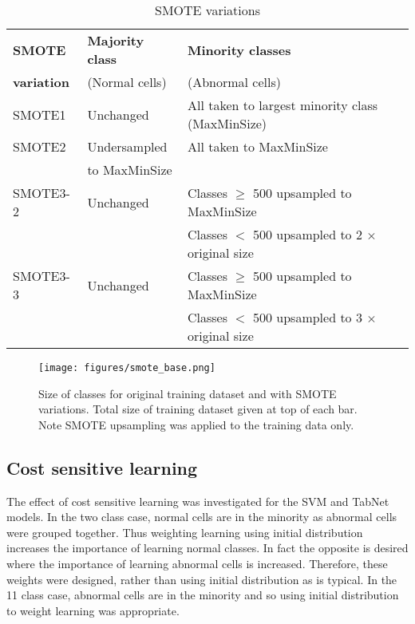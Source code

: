 \documentclass[final,5p,times,twocolumn,authoryear]{elsarticle}
\begin{document}
\begin{table}[t!]
\caption{SMOTE variations}
\scriptsize
\centering
\begin{tabular}{@{}lll@{}} 
\toprule
    \centering
    \textbf{SMOTE}  & \textbf{Majority class} & \textbf{Minority classes} \\ 
     \textbf{variation}& (Normal cells) & (Abnormal cells) \\ \midrule
    SMOTE1 & Unchanged & All taken to largest minority class (MaxMinSize) \\
    SMOTE2 & Undersampled & All taken to MaxMinSize \\
    & to MaxMinSize  & \\
    SMOTE3-2 & Unchanged & Classes $\geqslant$ 500 upsampled to MaxMinSize \\
      &  & Classes $<$ 500 upsampled to 2 $\times$ original size \\     
    SMOTE3-3 & Unchanged & Classes $\geqslant$ 500 upsampled to MaxMinSize \\
      &  & Classes $<$ 500 upsampled to 3 $\times$ original size \\
 \bottomrule
\end{tabular}

\label{table:5}
\end{table}

\begin{figure}[t!]
	\centering
	\texttt{[image: figures/smote\_base.png]}
	\caption[Effect of SMOTE on dataset size by class]{Size of classes for original training dataset and with SMOTE variations. Total size of training dataset given at top of each bar. Note SMOTE upsampling was applied to the training data only.}
	\label{fig:smote_base}
\end{figure}

\subsection{Cost sensitive learning}
\label{subsec:subsec05}

The effect of cost sensitive learning was investigated for the SVM and TabNet models. In the two class case, normal cells are in the minority as abnormal cells were grouped together. Thus weighting learning using initial distribution increases the importance of learning normal classes. In fact the opposite is desired where the importance of learning abnormal cells is increased. Therefore, these weights were designed, rather than using initial distribution as is typical. In the 11 class case, abnormal cells are in the minority and so using initial distribution to weight learning was appropriate.
\end{document}
